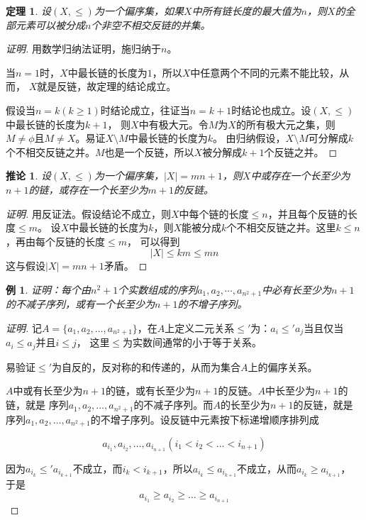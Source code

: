 \documentclass{book}[oneside]
\newtheorem{Thm}{定理}[chapter]
\newtheorem{Example}{例}[chapter]
\newtheorem{Cor}{推论}
\begin{document}
\begin{CJK*}{UTF8}{gbsn}
  \begin{Thm}
    设$(X,\leq)$为一个偏序集，如果$X$中所有链长度的最大值为$n$，则$X$的全部元素可以被分成$n$个非空不相交反链的并集。
  \end{Thm}
  \begin{proof}[证明]
    用数学归纳法证明，施归纳于$n$。

    当$n=1$时，$X$中最长链的长度为$1$，所以$X$中任意两个不同的元素不能比较，从而，
    $X$就是反链，故定理的结论成立。

    假设当$n=k(k\geq 1)$时结论成立，往证当$n=k+1$时结论也成立。设$(X,\leq)$中最长链的长度为$k+1$，
    则$X$中有极大元。令$M$为$X$的所有极大元之集，则$M\neq \phi$且$M\neq X$。易证$X\setminus M$中最长链的长度为$k$。
    由归纳假设，$X\setminus M$可分解成$k$个不相交反链之并。$M$也是一个反链，所以$X$被分解成$k+1$个反链之并。
  \end{proof}
  \begin{Cor}
    设$(X,\leq)$为一个偏序集，$|X|=mn+1$，则$X$中或存在一个长至少为$n+1$的链，或存在一个长至少为$m+1$的反链。
  \end{Cor}
  \begin{proof}[证明]
       用反证法。假设结论不成立，则$X$中每个链的长度$\leq n$，并且每个反链的长度$\leq m$。
       设$X$中最长链的长度为$k$，则$X$能被分成$k$个不相交反链之并。这里$k\leq n$，再由每个反链的长度$\leq m$，
        可以得到\[|X|\leq km \leq mn\]
        这与假设$|X|=mn+1$矛盾。
  \end{proof}
  \begin{Example}
    证明：每个由$n^2+1$个实数组成的序列$a_1,a_2,\cdots,a_{n^2+1}$中必有长至少为$n+1$的不减子序列，或有一个长至少为$n+1$的不增子序列。
  \end{Example}
\begin{proof}[证明]
  记$A=\{a_1,a_2,\ldots, a_{n^2+1}\}$，在$A$上定义二元关系$\leq'$为：$a_i\leq'a_j$当且仅当$a_i\leq a_j$并且$i\leq j$，
  这里$\leq$为实数间通常的小于等于关系。

  易验证$\leq'$为自反的，反对称的和传递的，从而为集合$A$上的偏序关系。

  $A$中或有长至少为$n+1$的链，或有长至少为$n+1$的反链。$A$中长至少为$n+1$的链，就是
  序列$a_1,a_2,\ldots,a_{n^2+1}$的不减子序列。而$A$的长至少为$n+1$的反链，就是
  序列$a_1,a_2,\ldots,a_{n^2+1}$的不增子序列。设反链中元素按下标递增顺序排列成

  \[a_{i_1},a_{i_2},\ldots, a_{i_{n+1}}(i_1<i_2<\ldots<i_{n+1})\]

  因为$a_{i_k}\leq'a_{i_{k+1}}$不成立，而$i_k<i_{k+1}$，所以$a_{i_k}\leq a_{i_{k+1}}$不成立，从而$a_{i_k}\geq a_{i_{k+1}}$，
  于是
  \[a_{i_1}\geq a_{i_2}\geq \ldots\geq a_{i_{n+1}}\]


\end{proof}
\end{CJK*}
\end{document}
